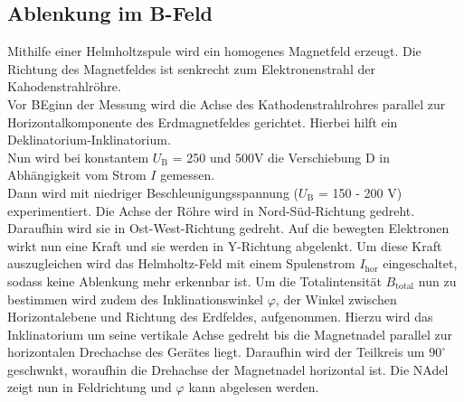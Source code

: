 \subsection{Ablenkung im B-Feld}
 
 Mithilfe einer Helmholtzspule wird ein homogenes Magnetfeld erzeugt. Die Richtung des Magnetfeldes ist senkrecht zum Elektronenstrahl der Kahodenstrahlröhre. \\
 Vor BEginn der Messung wird die Achse des Kathodenstrahlrohres parallel zur Horizontalkomponente des Erdmagnetfeldes gerichtet. Hierbei hilft ein Deklinatorium-Inklinatorium. \\
Nun wird bei konstantem $U_\text{B}$ = 250 und 500V die Verschiebung D in Abhängigkeit vom Strom $I$ gemessen. 
\\
Dann wird mit niedriger Beschleunigungsspannung ($U_\text{B}$ = 150 - 200 V) experimentiert. Die Achse der Röhre wird in Nord-Süd-Richtung gedreht. Daraufhin wird sie in Ost-West-Richtung gedreht. Auf die bewegten Elektronen wirkt nun eine Kraft und sie werden in Y-Richtung abgelenkt. Um diese Kraft auszugleichen wird das Helmholtz-Feld mit einem Spulenstrom $I_\text{hor}$ eingeschaltet, sodass keine Ablenkung mehr erkennbar ist. Um die Totalintensität $B_\text{total}$ nun zu bestimmen wird zudem des Inklinationswinkel $\varphi$, der Winkel zwischen Horizontalebene und Richtung des Erdfeldes, aufgenommen. Hierzu wird das Inklinatorium um seine vertikale Achse gedreht bis die Magnetnadel parallel zur horizontalen Drechachse des Gerätes liegt. Daraufhin wird der Teilkreis um $90^\circ$ geschwnkt, woraufhin die Drehachse der Magnetnadel horizontal ist. Die NAdel zeigt nun in Feldrichtung und $\varphi$ kann abgelesen werden.